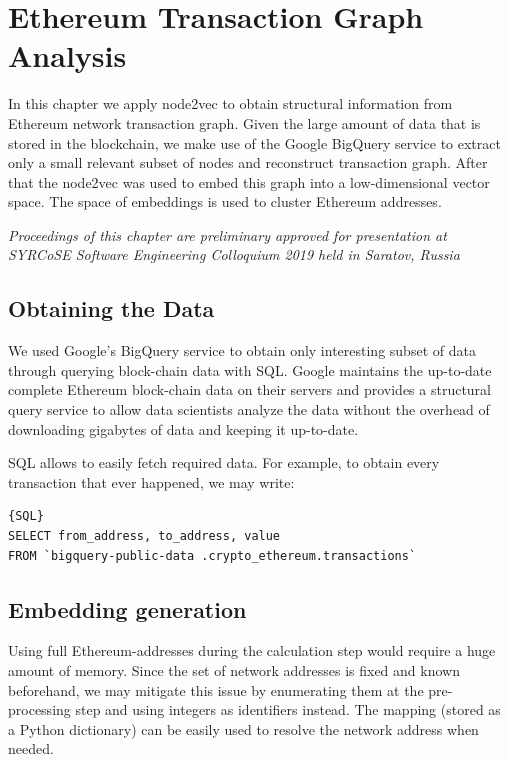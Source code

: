 \chapter{Ethereum Transaction Graph Analysis}\label{chap:3}

In this chapter we apply node2vec to obtain structural information from Ethereum network transaction graph. Given the large amount of data that is stored in the blockchain, we make use of the Google BigQuery service to extract only a small relevant subset of nodes and reconstruct transaction graph. After that the node2vec was used to embed this graph into a low-dimensional vector space. The space of embeddings is used to cluster Ethereum addresses.

\textit{Proceedings of this chapter are preliminary approved for presentation at SYRCoSE Software Engineering Colloquium 2019 held in Saratov, Russia} \cite{salnikov2019node2vec}

\section{Obtaining the Data}
We used Google's BigQuery service to obtain only interesting subset of data through querying block-chain data with SQL. Google maintains the up-to-date complete Ethereum block-chain data on their servers and provides a structural query service to allow data scientists analyze the data without the overhead of downloading gigabytes of data and keeping it up-to-date. 

SQL allows to easily fetch required data. For example, to obtain every transaction that ever happened, we may write:


\begin{lstlisting}{SQL}
SELECT from_address, to_address, value
FROM `bigquery-public-data .crypto_ethereum.transactions`
\end{lstlisting}

\section{Embedding generation}

Using full Ethereum-addresses during the calculation step would require a huge amount of memory. Since the set of network addresses is fixed and known beforehand, we may mitigate this issue by enumerating them at the pre-processing step and using integers as identifiers instead. The mapping (stored as a Python dictionary) can be easily used to resolve the network address when needed.


